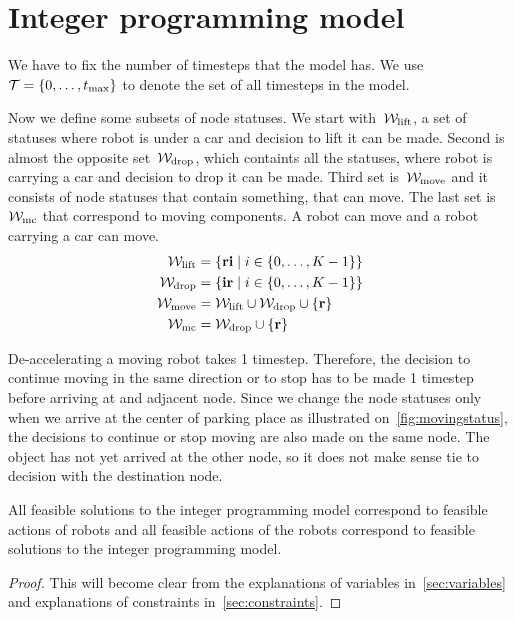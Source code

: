 \section{Integer programming model}
We have to fix the number of timesteps that the model has. We use $\mathcal{T} =
\{0,\ldots,t_{\max}\}$ to denote the set of all timesteps in the model.

Now we define some subsets of node statuses. We start with~$\mathcal{W}_\mathrm{lift}$, a set of
statuses where robot is under a car and decision to lift it can be made. Second
is almost the opposite set~$\mathcal{W}_\mathrm{drop}$, which containts all the statuses, where robot
is carrying a car and decision to drop it can be made. Third set is~$\mathcal{W}_\mathrm{move}$ and
it consists of node statuses that contain something, that can move. The last
set is~$\mathcal{W}_\mathrm{mc}$ that correspond to moving components. A robot can move and a
robot carrying a car can move.
\begin{align}
    \mathcal{W}_\mathrm{lift} &= \{\text{\bf ri} \mid i \in \{0,\ldots,K-1\}\}\\
    \mathcal{W}_\mathrm{drop} &= \{\text{\bf ir} \mid i \in \{0,\ldots,K-1\}\}\\
    \mathcal{W}_\mathrm{move} &= \mathcal{W}_\mathrm{lift} \cup \mathcal{W}_\mathrm{drop} \cup \{\text{\bf r}\}\\
    \mathcal{W}_\mathrm{mc} &= \mathcal{W}_\mathrm{drop} \cup \{\text{\bf r}\}
\end{align}

De-accelerating a moving robot takes 1 timestep. Therefore, the decision to continue
moving in the same direction or to stop has to be made 1 timestep before
arriving at and adjacent node. Since we change the node statuses only when we
arrive at the center of parking place as illustrated
on~\autoref{fig:movingstatus}, the decisions to continue or stop moving are
also made on the same node. The object has not yet arrived at the other node,
so it does not make sense tie to decision with the destination node.

\begin{lemma}
    All feasible solutions to the integer programming model correspond to feasible
    actions of robots and all feasible actions of the robots correspond to
    feasible solutions to the integer programming model.
\end{lemma}
\begin{proof}
    This will become clear from the explanations of variables
    in~\autoref{sec:variables} and explanations of constraints
    in~\autoref{sec:constraints}.
\end{proof}
